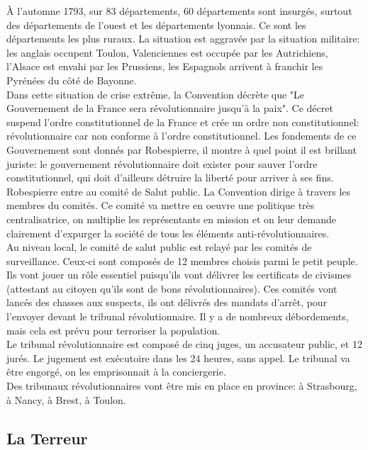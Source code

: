\documentclass[10pt, a4paper, openany]{book}
\begin{document}
À l'automne 1793, sur 83 départements, 60 départements sont insurgés, surtout des départements de l'ouest et les départements lyonnais. Ce sont les départements les plus ruraux. La situation est aggravée par la situation militaire: les anglais occupent Toulon, Valenciennes est occupée par les Autrichiens, l'Alsace est envahi par les Prussiens, les Espagnols arrivent à franchir les Pyrénées du côté de Bayonne. \\
Dans cette situation de crise extrême, la Convention décrète que "Le Gouvernement de la France sera révolutionnaire jusqu'à la paix". Ce décret suspend l'ordre constitutionnel de la France et crée un ordre non constitutionnel: révolutionnaire car non conforme à l'ordre constitutionnel. Les fondements de ce Gouvernement sont donnés par Robespierre, il montre à quel point il est brillant juriste: le gouvernement révolutionnaire doit exister pour sauver l'ordre constitutionnel, qui doit d'ailleurs détruire la liberté pour arriver à ses fins. \\
Robespierre entre au comité de Salut public. La Convention dirige à travers les membres du comités. Ce comité va mettre en oeuvre une politique très centralisatrice, on multiplie les représentants en mission et on leur demande clairement d'expurger la société de tous les éléments anti-révolutionnaires. \\
Au niveau local, le comité de salut public est relayé par les comités de surveillance. Ceux-ci sont composés de 12 membres choisis parmi le petit peuple. Ils vont jouer un rôle essentiel puisqu'ils vont délivrer les certificats de civismes (attestant au citoyen qu'ils sont de bons révolutionnaires). Ces comités vont lancés des chasses aux suspects, ils ont délivrés des mandats d'arrêt, pour l'envoyer devant le tribunal révolutionnaire. Il y a de nombreux débordements, mais cela est prévu pour terroriser la population. \\
Le tribunal révolutionnaire est composé de cinq juges, un accusateur public, et 12 jurés. Le jugement est exécutoire dans les 24 heures, sans appel. Le tribunal va être engorgé, on les emprisonnait à la conciergerie. \\
Des tribunaux révolutionnaires vont être mis en place en province: à Strasbourg, à Nancy, à Brest, à Toulon. 



\subsection{La Terreur}
\end{document}
